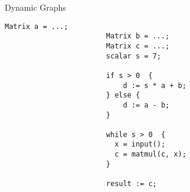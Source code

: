 %


\begin{frame}[fragile]{Dynamic Graphs}
      \begin{lstlisting}[language=pseudoML]
                        Matrix a = ...;
                        Matrix b = ...;
                        Matrix c = ...;
                        scalar s = 7;

                        if s > 0  {
                            d := s * a + b;
                        } else {
                            d := a - b;
                        }

                        while s > 0  {
                          x = input();
                          c = matmul(c, x);
                        }

                        result := c;
      \end{lstlisting}
\end{frame}
